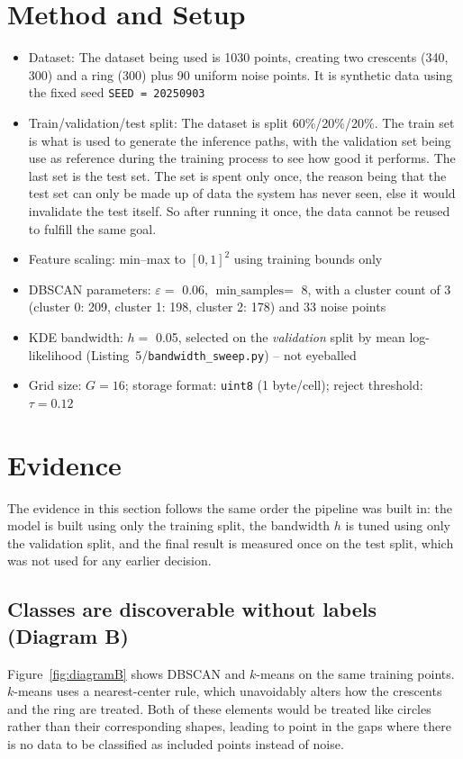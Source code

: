 \documentclass[10pt,a4paper,twocolumn]{article}
\begin{document}
\section{Method and Setup}
 
\begin{itemize}
  \item Dataset: The dataset being used is 1030 points, creating two crescents (340, 300) and
        a ring (300) plus 90 uniform noise points. It is synthetic data using the fixed
        seed \texttt{SEED = 20250903}
  \item Train/validation/test split: The dataset is split 60\%/20\%/20\%. The train set is what is used to generate the inference paths, with the validation set being use as reference during the training process to see how good it performs. The last set is the test set. The set is spent only once, the reason being that the test set can only be made up of data the system has never seen, else it would invalidate the test itself. So after running it once, the data cannot be reused to fulfill the same goal.
  \item Feature scaling: min--max to $[0,1]^2$ using training bounds only
  \item DBSCAN parameters: $\varepsilon = $ 0.06, $\text{min\_samples} = $
        8, with a cluster count of 3 (cluster 0: 209, cluster 1: 198, cluster 2: 178) and 33 noise points
  \item KDE bandwidth: $h = $ 0.05, selected on the
        \emph{validation} split by mean log-likelihood
        (Listing~5/\texttt{bandwidth\_sweep.py}) -- not eyeballed
  \item Grid size: $G = 16$; storage format: \texttt{uint8}
        (1 byte/cell); reject threshold: $\tau = 0.12$
\end{itemize}

\section{Evidence}

The evidence in this section follows the same order the pipeline was built in: the model is built using only the training split, the bandwidth $h$ is tuned using only the validation split, and the final result is measured once on the test split, which was not used for any earlier decision.
 
\subsection{Classes are discoverable without labels (Diagram B)}
Figure~\ref{fig:diagramB} shows DBSCAN and $k$-means on the same
training points. $k$-means uses a nearest-center rule, which unavoidably alters how the crescents and the ring are treated. Both of these elements would be treated like circles rather than their corresponding shapes, leading to point in the gaps where there is no data to be classified as included points instead of noise.
 
\end{document}

